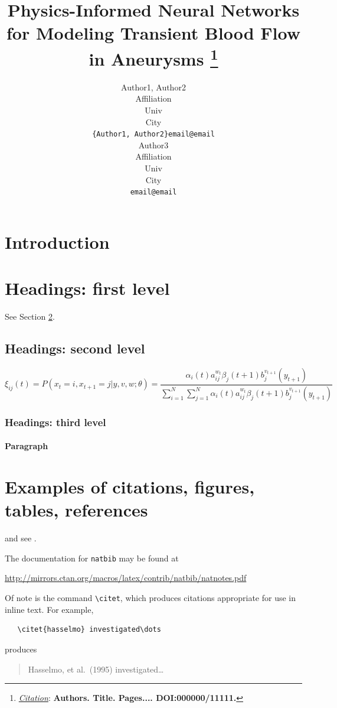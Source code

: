 \documentclass{article}
\title{Physics-Informed Neural Networks for Modeling Transient Blood Flow in Aneurysms
\thanks{\textit{\underline{Citation}}: 
\textbf{Authors. Title. Pages.... DOI:000000/11111.}} 
}
\author{
  Author1, Author2 \\
  Affiliation \\
  Univ \\
  City\\
  \texttt{\{Author1, Author2\}email@email} \\
   \And
  Author3 \\
  Affiliation \\
  Univ \\
  City\\
  \texttt{email@email} \\
}
\begin{document}
\maketitle


\begin{abstract}
\lipsum[1]
\end{abstract}




\section{Introduction}
\lipsum[2]
\lipsum[3]


\section{Headings: first level}
\label{sec:headings}

\lipsum[4] See Section \ref{sec:headings}.

\subsection{Headings: second level}
\lipsum[5]
\begin{equation}
\xi _{ij}(t)=P(x_{t}=i,x_{t+1}=j|y,v,w;\theta)= {\frac {\alpha _{i}(t)a^{w_t}_{ij}\beta _{j}(t+1)b^{v_{t+1}}_{j}(y_{t+1})}{\sum _{i=1}^{N} \sum _{j=1}^{N} \alpha _{i}(t)a^{w_t}_{ij}\beta _{j}(t+1)b^{v_{t+1}}_{j}(y_{t+1})}}
\end{equation}

\subsubsection{Headings: third level}
\lipsum[6]

\paragraph{Paragraph}
\lipsum[7]

\section{Examples of citations, figures, tables, references}
\label{sec:others}
\lipsum[8] \cite{kour2014real,kour2014fast} and see \cite{hadash2018estimate}.

The documentation for \verb+natbib+ may be found at
\begin{center}
  \url{http://mirrors.ctan.org/macros/latex/contrib/natbib/natnotes.pdf}
\end{center}
Of note is the command \verb+\citet+, which produces citations
appropriate for use in inline text.  For example,
\begin{verbatim}
   \citet{hasselmo} investigated\dots
\end{verbatim}
produces
\begin{quote}
  Hasselmo, et al.\ (1995) investigated\dots
\end{quote}
\end{document}
